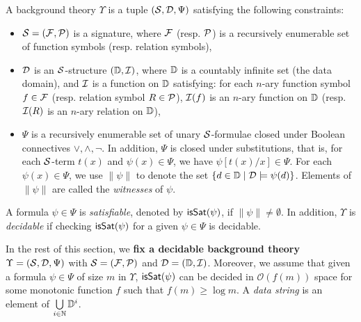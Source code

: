 \begin{definition}
A background theory  $\Upsilon$ is a tuple $(\mathcal{S}, \mathcal{D}, \Psi)$ satisfying the following constraints:
\begin{itemize}
\item $\mathcal{S}=({\mathcal{F}}, {\mathcal{P}})$ is a signature, where ${\mathcal{F}}$ (resp. ${\mathcal{P}}$) is a recursively enumerable set of function symbols (resp. relation symbols), 
%

\item $\mathcal{D}$ is an $\mathcal{S}$-structure $(\mathbb{D}, \mathcal{I})$, where $\mathbb{D}$ is a countably infinite set (the data domain), and $\mathcal{I}$ is a function on $\mathbb{D}$ satisfying: for each $n$-ary function symbol $f \in {\mathcal{F}}$ (resp. relation symbol $R \in {\mathcal{P}}$), $\mathcal{I}(f)$ is an $n$-ary function on $\mathbb{D}$ (resp. $\mathcal{I}(R)$ is an $n$-ary relation on $\mathbb{D}$),
%
\item $\Psi$ is a recursively enumerable set of unary $\mathcal{S}$-formulae closed under Boolean connectives $\vee, \wedge, \neg$. In addition, $\Psi$ is closed under substitutions, that is, for each $\mathcal{S}$-term $t(x)$ and $\psi(x) \in \Psi$, we have $\psi[t(x)/x] \in \Psi$.
For each $\psi(x) \in \Psi$, we use $\|\psi\|$ to denote the set $\{d \in \mathbb{D} \mid  \mathcal{D} \models \psi(d)\}$. Elements of $\| \psi\|$ are called the \emph{witnesses} of $\psi$.
\end{itemize}
A formula $\psi \in \Psi$ is \emph{satisfiable}, denoted by $\mathsf{isSat}(\psi)$, if $\|\psi\| \neq \emptyset$. In addition, $\Upsilon$ is \emph{decidable} if  checking  $\mathsf{isSat}(\psi)$ for a  given $\psi \in\Psi$ is decidable.
\end{definition}

In the rest of this section, we {\bf fix a decidable background theory} $\Upsilon=(\mathcal{S}, \mathcal{D}, \Psi)$ with $\mathcal{S}=({\mathcal{F}}, {\mathcal{P}})$ and $\mathcal{D} = (\mathbb{D}, \mathcal{I})$. Moreover, we assume that given a formula $\psi \in \Psi$ of size $m$ in $\Upsilon$, $\mathsf{isSat}(\psi)$ can be decided in $\mathcal{O}(f(m))$ space for some monotonic function $f$ such that $f(m) \ge \log m$.
%
%
A \emph{data string} is an element of $\bigcup \limits_{i \in \mathbb{N}} \mathbb{D}^i$.

